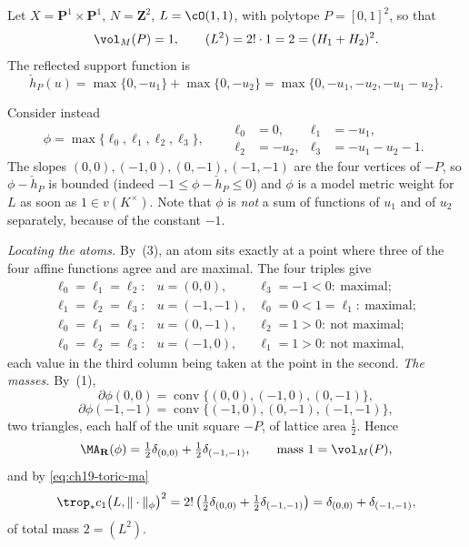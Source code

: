 \begin{example}
\label{ex:ch19-toric-two-atoms}
Let $X=\mathbf P^1\times\mathbf P^1$, $N=\mathbf Z^2$,
$L=\cO(1,1)$, with polytope $P=[0,1]^2$, so that
\[
 \vol_M(P)=1,
 \qquad
 (L^2)=2!\cdot1=2=(H_1+H_2)^2 .
\]
The reflected support function is
\[
 \check h_P(u)=\max\{0,-u_1\}+\max\{0,-u_2\}
              =\max\{0,-u_1,-u_2,-u_1-u_2\}.
\]

Consider instead
\[
 \phi=\max\{\ell_0,\ell_1,\ell_2,\ell_3\},
 \qquad
 \begin{aligned}
  \ell_0&=0, &\ell_1&=-u_1,\\
  \ell_2&=-u_2, &\ell_3&=-u_1-u_2-1 .
 \end{aligned}
\]
The slopes $(0,0),(-1,0),(0,-1),(-1,-1)$ are the four vertices of
$-P$, so $\phi-\check h_P$ is bounded (indeed $-1\leq\phi-\check
h_P\leq0$) and $\phi$ is a model metric weight for $L$ as soon as
$1\in v(K^\times)$.  Note that $\phi$ is \emph{not} a sum of functions of
$u_1$ and of $u_2$ separately, because of the constant $-1$.

\emph{Locating the atoms.}  By
\,(3), an atom sits exactly at a point
where three of the four affine functions agree and are maximal.  The four
triples give
\[
\begin{array}{lll}
 \ell_0=\ell_1=\ell_2:& u=(0,0),
  &\ell_3=-1<0:\ \text{maximal};\\
 \ell_1=\ell_2=\ell_3:& u=(-1,-1),
  &\ell_0=0<1=\ell_1:\ \text{maximal};\\
 \ell_0=\ell_1=\ell_3:& u=(0,-1),
  &\ell_2=1>0:\ \text{not maximal};\\
 \ell_0=\ell_2=\ell_3:& u=(-1,0),
  &\ell_1=1>0:\ \text{not maximal},
\end{array}
\]
each value in the third column being taken at the point in the second.
\emph{The masses.}  By \,(1),
\[
 \partial\phi(0,0)=\operatorname{conv}\{(0,0),(-1,0),(0,-1)\},
\]
\[
 \partial\phi(-1,-1)=\operatorname{conv}\{(-1,0),(0,-1),(-1,-1)\},
\]
two triangles, each half of the unit square $-P$, of lattice area
$\tfrac12$.  Hence
\[
 \MA_{\mathbf R}(\phi)
 =\tfrac12\delta_{(0,0)}+\tfrac12\delta_{(-1,-1)},
 \qquad\text{mass }1=\vol_M(P),
\]
and by \eqref{eq:ch19-toric-ma}
\[
 \trop_*c_1\bigl(L,\|\cdot\|_\phi\bigr)^2
 =2!\left(\tfrac12\delta_{(0,0)}+\tfrac12\delta_{(-1,-1)}\right)
 =\delta_{(0,0)}+\delta_{(-1,-1)},
\]
of total mass $2=(L^2)$.


\end{example}
